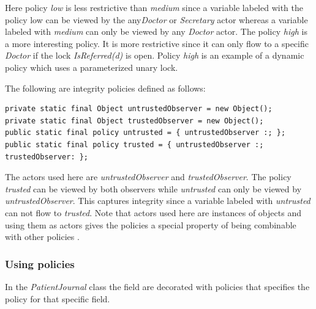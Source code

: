 Here policy \emph{low} is less restrictive than \emph{medium} since a variable labeled with the policy low can be viewed by the any\emph{Doctor} or \emph{Secretary} actor whereas a variable labeled with \emph{medium} can only be viewed by any \emph{Doctor} actor. The policy \emph{high} is a more interesting policy. It is more restrictive since it can only flow to a specific \emph{Doctor} if the lock \emph{IsReferred(d)} is open. Policy \emph{high} is an example of a dynamic policy which uses a parameterized unary lock.

The following are integrity policies defined as follows:
\begin{lstlisting}
private static final Object untrustedObserver = new Object();
private static final Object trustedObserver = new Object();
public static final policy untrusted = { untrustedObserver :; };
public static final policy trusted = { untrustedObserver :; trustedObserver: };
\end{lstlisting}


The actors used here are \emph{untrustedObserver} and \emph{trustedObserver}. The policy \emph{trusted} can be viewed by both observers while \emph{untrusted} can only be viewed by \emph{untrustedObserver}. This captures integrity since a variable labeled with \emph{untrusted} can not flow to \emph{trusted}. Note that actors used here are instances of objects and using them as actors gives the policies a special property of being combinable with other policies \cite{paragonprogramming}.





\subsubsection{Using policies}
In the \emph{PatientJournal} class the field are decorated with policies that specifies the policy for that specific field. 

